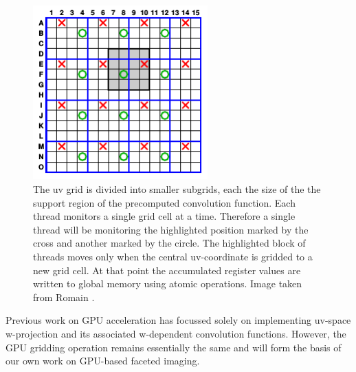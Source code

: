 \documentclass[a4paper, two column]{article}
\begin{document}
\begin{figure}
 \begin{mdframed}
  \centering
  \includegraphics[width=0.6\textwidth]{work_dist_strategy.png}
  \caption{The uv grid is divided into smaller subgrids, each the size of the the support region of the precomputed convolution function. Each thread monitors a single
  grid cell at a time. Therefore a single thread will be monitoring the highlighted position marked by the cross and another marked by the circle. The highlighted block of 
  threads moves only when the central uv-coordinate is gridded to a new grid cell. At that point the accumulated register values are written to global memory using atomic 
  operations. Image taken from Romain \cite{romein2012efficient}.}
  \label{IMG_WORK_DIST_STRATEGY}
 \end{mdframed}
\end{figure}

Previous work on GPU acceleration has focussed solely on implementing uv-space w-projection and its associated w-dependent convolution functions. However, the GPU gridding 
operation remains essentially the same and will form the basis of our own work on GPU-based faceted imaging.
\end{document}
